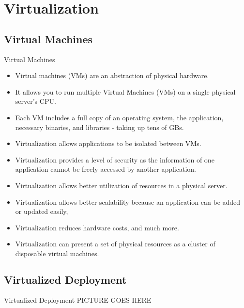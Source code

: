 

\section{Virtualization}\label{sec:virtualization}

\subsection{Virtual Machines}\label{subsec:virtual-machines}
\begin{frame}{Virtual Machines}
    \begin{itemize}[<+- | alert@+>]
        \item Virtual machines (VMs) are an abstraction of physical hardware.
        \item It allows you to run multiple Virtual Machines (VMs) on a single physical server's CPU\@.
        \item Each VM includes a full copy of an operating system, the application, necessary binaries, and libraries - taking up tens of GBs.
        \item Virtualization allows applications to be isolated between VMs.
        \item Virtualization provides a level of security as the information of one application cannot be freely accessed by another application.
        \item Virtualization allows better utilization of resources in a physical server.
        \item Virtualization allows better scalability because an application can be added or updated easily,
        \item Virtualization reduces hardware costs, and much more.
        \item Virtualization can present a set of physical resources as a cluster of disposable virtual machines.
    \end{itemize}
\end{frame}

\subsection{Virtualized Deployment}\label{subsec:virtualized-deployment}
\begin{frame}{Virtualized Deployment}
    PICTURE GOES HERE
\end{frame}


